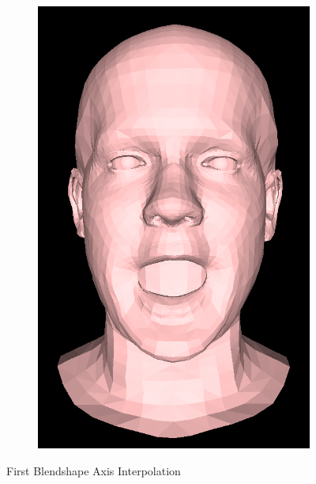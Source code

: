 \begin{figure}[h]
\begin{subfigure}[b]{0.24\textwidth}
        \includegraphics[width=\textwidth]{figures/blendshape_interp/1/00004.png}
    \end{subfigure}
    \caption{First Blendshape Axis Interpolation }\label{fig:Blendshape_axis_1}
\end{figure}
